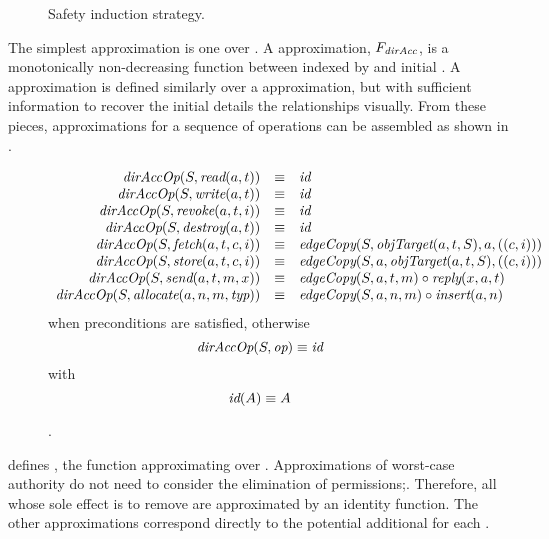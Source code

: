 \begin{figure}
\centering
  \FIGfullApproxMath{}
\caption{\label{fig:sketch:induction}Safety induction strategy.}
\end{figure}

The simplest approximation is one over \TMdirAccAGs{}.
A \TMdirAcc{} approximation, \(F_{\textit{dirAcc}}\), is a monotonically non-decreasing function between \TMdirAccAGs{} indexed by \TMop{} and initial \TMsystemState{}.
A \TMpotAcc{} approximation is defined similarly over a \TMdirAcc{} approximation, but with sufficient information to recover the initial \TMsystemState{}
 details the relationships visually.
From these pieces, approximations for a sequence of operations can be assembled as shown in .

\begin{figure}
  \[
  \begin{array}{rcl}
  \textit{dirAccOp}(S,\textit{read}(a,t)) & \equiv & \textit{id} \\
  \textit{dirAccOp}(S,\textit{write}(a,t)) & \equiv & \textit{id} \\
  \textit{dirAccOp}(S,\textit{revoke}(a,t,i)) & \equiv & \textit{id} \\
  \textit{dirAccOp}(S,\textit{destroy}(a,t)) & \equiv & \textit{id} \\
  \textit{dirAccOp}(S,\textit{fetch}(a,t,c,i)) & \equiv & \textit{edgeCopy}(S,\textit{objTarget}(a,t,S),a,((c,i))) \\
  \textit{dirAccOp}(S,\textit{store}(a,t,c,i)) & \equiv & \textit{edgeCopy}(S,a,\textit{objTarget}(a,t,S),((c,i))) \\
  \textit{dirAccOp}(S,\textit{send}(a,t,m,x)) & \equiv & \textit{edgeCopy}(S,a,t,m) \circ \textit{reply}(x,a,t) \\
  \textit{dirAccOp}(S,\textit{allocate}(a,n,m,\textit{typ})) & \equiv & \textit{edgeCopy}(S,a,n,m) \circ \textit{insert}(a,n)
  \end{array}
  \]
  when preconditions are satisfied, otherwise
  \[
  \textit{dirAccOp}(S,\textit{op}) \equiv \textit{id}
  \]
  with
  \[
  \textit{id}(A) \equiv A
  \]
\caption{\xmakefirstuc{\TMdirAccOp}. \label{fig:sketch:drAccOp}}
\end{figure}

 defines \NMdirAccOp{}, the function approximating \TMdirAccAGs{} over \TMops{}.
Approximations of worst-case authority do not need to consider the elimination of permissions;.
Therefore, all \TMops{} whose sole effect is to remove \TMcaps{} are approximated by an identity function.
The other \TMdirAcc{} approximations correspond directly to the potential additional \TMaccessRights{} for each \TMop{}.

